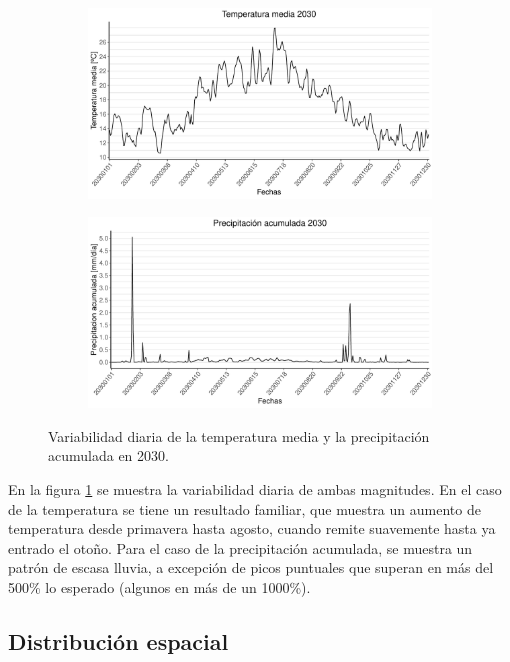 \documentclass[9pt,twocolumn,twoside]{opticajnl}
\begin{document}
\addtocounter{figure}{1}
\begin{figure}[H]
\centering
\begin{subfigure}{0.415\textwidth}
\centering
\includegraphics[width=\textwidth]{fotos/plot4.pdf}
\end{subfigure}
\hfill
\begin{subfigure}{0.415\textwidth}
\centering
\includegraphics[width=\textwidth]{fotos/plot9.pdf}
\end{subfigure}
\caption{Variabilidad diaria de la temperatura media y la precipitación acumulada en 2030.}
\label{fig:1}
\end{figure}

En la figura \ref{fig:1} se muestra la variabilidad diaria de ambas magnitudes. En el caso de la temperatura se tiene un resultado familiar, que muestra un aumento de temperatura desde primavera hasta agosto, cuando remite suavemente hasta ya entrado el otoño. Para el caso de la precipitación acumulada, se muestra un patrón de escasa lluvia, a excepción de picos puntuales que superan en más del 500\% lo esperado (algunos en más de un 1000\%).

\subsection{Distribución espacial}
\end{document}
